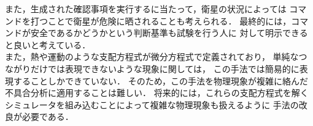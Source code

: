 \documentclass[11pt]{article}
\begin{document}
また，生成された確認事項を実行するに当たって，衛星の状況によっては
コマンドを打つことで衛星が危険に晒されることも考えられる．
最終的には，コマンドが安全であるかどうかという判断基準も試験を行う人に
対して明示できると良いと考えている．\\
また，熱や運動のような支配方程式が微分方程式で定義されており，
単純なつながりだけでは表現できないような現象に関しては，
この手法では簡易的に表現することしかできていない．
そのため，この手法を物理現象が複雑に絡んだ不具合分析に適用することは難しい．
将来的には，これらの支配方程式を解く
シミュレータを組み込むことによって複雑な物理現象も扱えるように
手法の改良が必要である．

 
\end{document}
